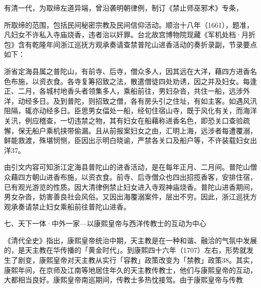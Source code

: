 有清一代，为取缔左道异端，曾沿袭明朝律例，制订《禁止师巫邪术》专条，

\vfill
\begin{BookNotes}
\end{BookNotes}

\noindent 所取缔的范围，包括民间秘密宗教及民间信仰活动。顺治十八年（1661），题准，凡妇女不许私入寺庙烧香，违者治以奸罪。台北故宫博物院现藏《军机处档·月折包》含有乾隆年间浙江巡抚方观承奏请查禁普陀山进香活动的奏折录副，节录要点如下：

\begin{BookQuote}
浙省定海县属之普陀山，有前寺、后寺，僧众多人，因其远在大洋，藉四方进香名色布施，以资衣食。各寺复筹招致之法，散遣僧徒四处劝诱，因之并及妇女。每逢正、二月，各城村地香头者领集多人，乘船前往，男妇杂沓，共住一船，远涉外洋，动经多日。及到普陀，则招致之僧，各有房头引之住址，有如主客。如遇风汛阻隔，辄亦动经多日。臣思男女偪处一船，经旬住宿山寺，既于风化有关，而海洋关汛，例应稽查，一切违禁之物，其有妇女在船藉称进香名色，即恐关口查验疏懈，保无船户乘机挟带偷漏。且从前报案妇女之由，汇明上海，远涉者每遭覆溺，鲜能救渡，殊堪悯恻，臣因出示明白晓谕，严禁各关口及船户等，不许装载妇女出洋37。
\end{BookQuote}

由引文内容可知浙江定海县普陀山的进香活动，是在每年正月、二月间。普陀山僧众藉四方朝山进香布施，以资衣食。前寺、后寺僧众也四出招揽香客，安排住宿，已有观光游览的性质。因大清律例禁止妇女进入寺观神庙烧香。普陀山进香期间，男女杂沓，妨害善良社会风俗。又因出海覆溺案件，层出不穷。因此，浙江巡抚方观承奏请禁止妇女乘船前往普陀山进香。

七、天下一体·中外一家—以康熙皇帝与西洋传教士的互动为中心

《清代全史》指出，康熙皇帝统治中期，天主教是在一种和谐、融洽的气氛中发展的，是天主教在华传播的「黄金时代」。到康熙四十六年（1707）左右，形势就发生了剧变，康熙皇帝对天主教从实行「容教」政策改变为「禁教」政策38。其实，康熙年间，在京师及江南等地居住年久的天主教传教士，他们与康熙皇帝的互动，大都相当良好。康熙皇帝南巡期间，传教士多热忱接驾。由于康熙皇帝与传教

\vfill
\begin{BookNotes}
\end{BookNotes}

